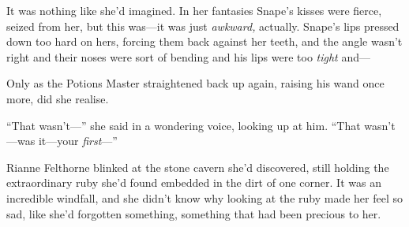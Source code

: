 It was nothing like she'd imagined. In her fantasies Snape's kisses were
fierce, seized from her, but this was---it was just \emph{awkward,}
actually. Snape's lips pressed down too hard on hers, forcing them back
against her teeth, and the angle wasn't right and their noses were sort
of bending and his lips were too \emph{tight} and---

Only as the Potions Master straightened back up again, raising his wand
once more, did she realise.

``That wasn't---'' she said in a wondering voice, looking up at him.
``That wasn't---was it---your \emph{first}---''

Rianne Felthorne blinked at the stone cavern she'd discovered, still
holding the extraordinary ruby she'd found embedded in the dirt of one
corner. It was an incredible windfall, and she didn't know why looking
at the ruby made her feel so sad, like she'd forgotten something,
something that had been precious to her.

